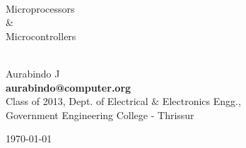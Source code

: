 

\begin{titlepage}

\vspace*{6cm}
\thispagestyle{empty}
\begin{center}
\HRule \\[0.4cm] { \fontsize{50pt}{55pt}\selectfont Microprocessors \\ \& \\[.3cm] Microcontrollers} \\[1.1cm] \HRule \\[1.5cm]

\begin{center} {\large Aurabindo J} \\[.2cm] { \bf aurabindo@computer.org} \\[.1cm] {Class of 2013, Dept. of Electrical $\&$ Electronics Engg.,} \\ Government Engineering College - Thrissur
\end{center} 



\vfill
{\large \today}

\end{center}


\end{titlepage}